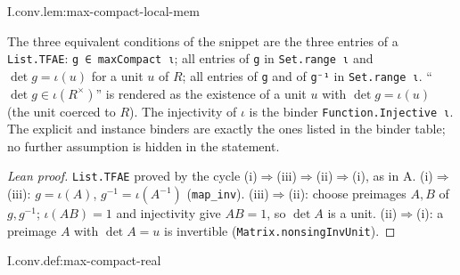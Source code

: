 \begin{lemma}[membership in $K(R)$]
\end{lemma}
\begin{tfformal}{I.conv.lem:max-compact-local-mem}
\begin{tffidelity}
The three equivalent conditions of the snippet are the three entries of a \texttt{List.TFAE}: \texttt{g ∈ maxCompact ι}; all entries of \texttt{g} in \texttt{Set.range ι} and $\det g=\iota(u)$ for a unit $u$ of $R$; all entries of \texttt{g} and of \texttt{g⁻¹} in \texttt{Set.range ι}. ``$\det g\in\iota(R^\times)$'' is rendered as the existence of a unit $u$ with $\det g=\iota(u)$ (the unit coerced to $R$). The injectivity of $\iota$ is the binder \texttt{Function.Injective ι}. The explicit and instance binders are exactly the ones listed in the binder table; no further assumption is hidden in the statement.
\end{tffidelity}
\end{tfformal}
\begin{proof}[Lean proof]
\texttt{List.TFAE} proved by the cycle (i)$\Rightarrow$(iii)$\Rightarrow$(ii)$\Rightarrow$(i), as in A. (i)$\Rightarrow$(iii): $g=\iota(A)$, $g^{-1}=\iota(A^{-1})$ (\texttt{map\_inv}). (iii)$\Rightarrow$(ii): choose preimages $A,B$ of $g,g^{-1}$; $\iota(AB)=1$ and injectivity give $AB=1$, so $\det A$ is a unit. (ii)$\Rightarrow$(i): a preimage $A$ with $\det A=u$ is invertible (\texttt{Matrix.nonsingInvUnit}).
\end{proof}

\begin{definition}[$\Kinf=\Ort(2)$]
\end{definition}
\begin{tfformal}{I.conv.def:max-compact-real}
\end{tfformal}


